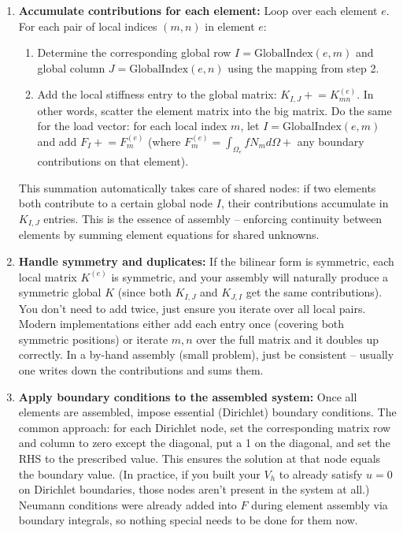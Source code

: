 \documentclass[a4paper,11pt]{article}
\begin{document}
\begin{enumerate}
    \item \textbf{Accumulate contributions for each element:} Loop over each element $e$. For each pair of local indices $(m,n)$ in element $e$:
          \begin{enumerate}
              \item Determine the corresponding global row $I = \text{GlobalIndex}(e, m)$ and global column $J = \text{GlobalIndex}(e, n)$ using the mapping from step 2.
              \item Add the local stiffness entry to the global matrix: $K_{I,J} \mathrel{+}= K^{(e)}_{mn}$. In other words, scatter the element matrix into the big matrix. Do the same for the load vector: for each local index $m$, let $I=\text{GlobalIndex}(e,m)$ and add $F_I \mathrel{+}= F^{(e)}_m$ (where $F^{(e)}_m = \int_{\Omega_e} f N_m d\Omega +$ any boundary contributions on that element).
          \end{enumerate}
          This summation automatically takes care of shared nodes: if two elements both contribute to a certain global node $I$, their contributions accumulate in $K_{I,J}$ entries. This is the essence of assembly -- enforcing continuity between elements by summing element equations for shared unknowns.

    \item \textbf{Handle symmetry and duplicates:} If the bilinear form is symmetric, each local matrix $K^{(e)}$ is symmetric, and your assembly will naturally produce a symmetric global $K$ (since both $K_{I,J}$ and $K_{J,I}$ get the same contributions). You don't need to add twice, just ensure you iterate over all local pairs. Modern implementations either add each entry once (covering both symmetric positions) or iterate $m,n$ over the full matrix and it doubles up correctly. In a by-hand assembly (small problem), just be consistent -- usually one writes down the contributions and sums them.

    \item \textbf{Apply boundary conditions to the assembled system:} Once all elements are assembled, impose essential (Dirichlet) boundary conditions. The common approach: for each Dirichlet node, set the corresponding matrix row and column to zero except the diagonal, put a 1 on the diagonal, and set the RHS to the prescribed value. This ensures the solution at that node equals the boundary value. (In practice, if you built your $V_h$ to already satisfy $u=0$ on Dirichlet boundaries, those nodes aren't present in the system at all.) Neumann conditions were already added into $F$ during element assembly via boundary integrals, so nothing special needs to be done for them now.


\end{enumerate}
\end{document}
